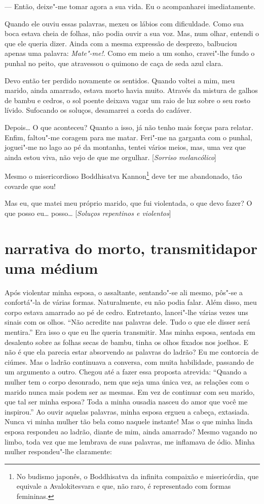 --- Então, deixe"-me tomar agora a sua vida. Eu o acompanharei
imediatamente.

Quando ele ouviu essas palavras, mexeu os lábios com dificuldade. Como
sua boca estava cheia de folhas, não podia ouvir a sua voz. Mas, num
olhar, entendi o que ele queria dizer. Ainda com a mesma expressão de
desprezo, balbuciou apenas uma palavra: \textit{Mate"-me!}. Como em meio a um
sonho, cravei"-lhe fundo o punhal no peito, que atravessou o quimono de
caça de seda azul clara.

Devo então ter perdido novamente os sentidos. Quando voltei a mim, meu
marido, ainda amarrado, estava morto havia muito. Através da mistura de
galhos de bambu e cedros, o sol poente deixava vagar um raio de luz
sobre o seu rosto lívido. Sufocando os soluços, desamarrei a corda do cadáver.

Depois\ldots{} O que aconteceu? Quanto a isso, já não tenho mais forças para
relatar. Enfim, faltou"-me coragem para me matar. Feri"-me na garganta
com o punhal, joguei"-me no lago ao pé da montanha, tentei vários meios,
mas, uma vez que ainda estou viva, não vejo de que me orgulhar. [\textit{Sorriso melancólico}]

Mesmo o misericordioso Boddhisatva Kannon\footnote{ No budismo japonês,
o Boddhisatva da infinita compaixão e misericórdia, que equivale a
Avalokitesvara e que, não raro, é representado com formas femininas.}
deve ter me abandonado, tão covarde que sou!

Mas eu, que matei meu próprio marido, que fui violentada, o que devo
fazer? O que posso eu\ldots{} posso\ldots{} [\textit{Soluços repentinos e violentos}]

\section*{narrativa do morto, transmitida\break por uma médium}

Após violentar minha esposa, o assaltante, sentando"-se ali mesmo,
pôs"-se a confortá"-la de várias formas. Naturalmente, eu não podia
falar. Além disso, meu corpo estava amarrado ao pé de cedro.
Entretanto, lancei"-lhe várias vezes uns sinais com os olhos. ``Não
acredite nas palavras dele. Tudo o que ele disser será mentira.'' Era
isso o que eu lhe queria transmitir. Mas minha esposa, sentada em
desalento sobre as folhas secas de bambu, tinha os olhos fixados nos
joelhos. E não é que ela parecia estar absorvendo as palavras do
ladrão? Eu me contorcia de ciúmes. Mas o ladrão continuava a conversa,
com muita habilidade, passando de um argumento a outro. Chegou até a
fazer essa proposta atrevida: ``Quando a mulher tem o corpo desonrado,
nem que seja uma única vez, as relações com o marido nunca mais podem
ser as mesmas. Em vez de continuar com seu marido, que tal ser minha
esposa? Toda a minha ousadia nasceu do amor que você me inspirou.'' Ao
ouvir aquelas palavras, minha esposa ergueu a cabeça, extasiada. Nunca
vi minha mulher tão bela como naquele instante! Mas o que minha linda
esposa respondeu ao ladrão, diante de mim, ainda amarrado? Mesmo
vagando no limbo, toda vez que me lembrava de suas palavras, me
inflamava de ódio. Minha mulher respondeu"-lhe claramente:

